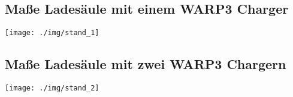 \documentclass[a4paper,10pt]{article}
\begin{document}
	\subsection*{Maße Ladesäule mit einem WARP3 Charger}
	\label{appendix_stand1}
	\begin{center}
		\texttt{[image: ./img/stand\_1]}
	\end{center}

	\subsection*{Maße Ladesäule mit zwei WARP3 Chargern}
	\label{appendix_stand2}
	\begin{center}
		\texttt{[image: ./img/stand\_2]}
	\end{center}
\end{document}

